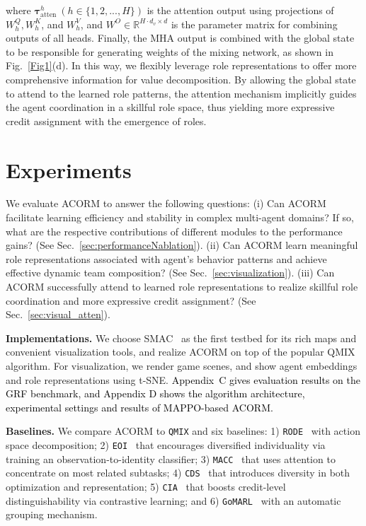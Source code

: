 \documentclass{article} %
\begin{document}
where $\bm{\tau}_{\text{atten}}^h~(h\in\{1,2,...,H\})$ is the attention output using projections of $W^Q_h, W^K_h$, and $W^V_h$, and $W^O\in \mathbb{R}^{H\cdot d_v\times d}$ is the parameter matrix for combining outputs of all heads.
Finally, the MHA output is combined with the global state to be responsible for generating weights of the mixing network, as shown in Fig.~\ref{Fig1}(d).
In this way, we flexibly leverage role representations to offer more comprehensive information for value decomposition.
By allowing the global state to attend to the learned role patterns, the attention mechanism implicitly guides the agent coordination in a skillful role space, thus yielding more expressive credit assignment with the emergence of roles.



\section{Experiments}
We evaluate ACORM to answer the following questions: 
(i) Can ACORM facilitate learning efficiency and stability in complex multi-agent domains? If so, what are the respective contributions of different modules to the performance gains? (See Sec.~\ref{sec:performanceNablation}). 
(ii) Can ACORM learn meaningful role representations associated with agent's behavior patterns and achieve effective dynamic team composition? (See Sec.~\ref{sec:visualization}).
(iii) Can ACORM successfully attend to learned role representations to realize skillful role coordination and more expressive credit assignment? (See Sec.~\ref{sec:visual_atten}).


\textbf{Implementations.} 
We choose SMAC~\citep{samvelyan2019starcraft} as the first testbed for its rich maps and convenient visualization tools, and realize ACORM on top of the popular QMIX algorithm.
For visualization, we render game scenes, and show agent embeddings and role representations using t-SNE.
\textcolor{black}{Appendix~C gives evaluation results on the GRF benchmark, and  Appendix D shows the algorithm architecture, experimental settings and results of MAPPO-based ACORM.}



\textbf{Baselines.} 
We compare ACORM to \texttt{QMIX} and six baselines: 1) \texttt{RODE}~\citep{wang2021rode} with action space decomposition; 2) \texttt{EOI}~\citep{jiang2021emergence} that encourages diversified individuality via training an observation-to-identity classifier; 3) \texttt{MACC}~\citep{yuan2022multi} that uses attention to concentrate on most related subtasks; 4) \texttt{CDS}~\citep{li2021celebrating} that introduces diversity in both optimization and representation; 5) \texttt{CIA}~\citep{liu2023contrastive} that boosts credit-level distinguishability via contrastive learning; and 6) \texttt{GoMARL}~\citep{zang2023automatic} with an automatic grouping mechanism.
\end{document}
